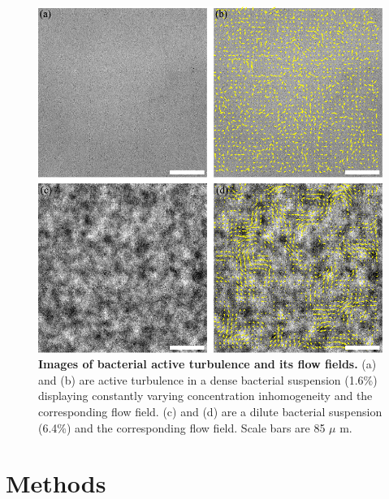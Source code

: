 \begin{figure}[htbp]
\begin{center}
\includegraphics[width=5.5in]{figs/5-GNF/1.pdf}
\caption[Images of Bacterial Active Turbulence and Its Flow Fields]
{
\textbf{Images of bacterial active turbulence and its flow fields.}
(a) and (b) are active turbulence in a dense bacterial suspension (1.6\%) displaying constantly varying concentration inhomogeneity and the corresponding flow field.
(c) and (d) are a dilute bacterial suspension (6.4\%) and the corresponding flow field.
Scale bars are 85 $\mu$ m.
}
\label{fig:experiment}
\end{center}
\end{figure}


\section{Methods}

